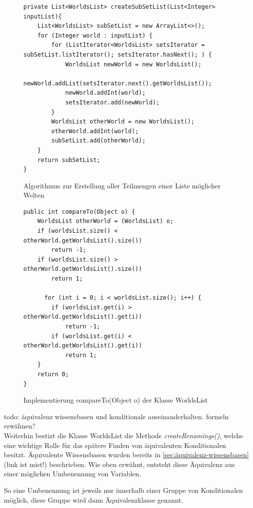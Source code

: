 \documentclass[12pt,a4paper]{article}
\begin{document}
\begin{figure}
\begin{lstlisting}
private List<WorldsList> createSubSetList(List<Integer> inputList){
    List<WorldsList> subSetList = new ArrayList<>();
    for (Integer world : inputList) {
        for (ListIterator<WorldsList> setsIterator = subSetList.listIterator(); setsIterator.hasNext(); ) {
            WorldsList newWorld = new WorldsList();
            newWorld.addList(setsIterator.next().getWorldsList());
            newWorld.addInt(world);
            setsIterator.add(newWorld);
        }
        WorldsList otherWorld = new WorldsList();
        otherWorld.addInt(world);
        subSetList.add(otherWorld);
    }
    return subSetList;
}
\end{lstlisting}
\caption{Algorithmus zur Erstellung aller Teilmengen einer Liste möglicher Welten}
\label{code:subsets}
\end{figure}



\begin{figure}
\begin{lstlisting}
public int compareTo(Object o) {
    WorldsList otherWorld = (WorldsList) o;
    if (worldsList.size() < otherWorld.getWorldsList().size())
        return -1;
    if (worldsList.size() > otherWorld.getWorldsList().size())
        return 1;
          
      for (int i = 0; i < worldsList.size(); i++) {
        if (worldsList.get(i) > otherWorld.getWorldsList().get(i))
            return -1;
        if (worldsList.get(i) < otherWorld.getWorldsList().get(i))
            return 1;
    }
    return 0;
}
\end{lstlisting}
\caption{Implementierung compareTo(Object o) der Klasse WorldsList}
\label{code:compare-worldslist}
\end{figure}

todo: äquivalenz wissensbasen und konditionale auseinanderhalten. formeln erwähnen? \\
Weiterhin bestizt die Klasse WorldsList die Methode \textit{createRenamings()}, welche eine wichtige Rolle für das spätere Finden von äquivalenten Konditionalen besitzt. Äquivalente Wissensbasen wurden bereits in  \autoref{sec:äquivalenz-wissensbasen} (link ist mist!) beschrieben. Wie oben erwähnt, entsteht diese Äquivalenz aus einer möglichen Umbenennung von Variablen. 

So eine Umbenennung ist jeweils nur innerhalb einer Gruppe von Konditionalen möglich, diese Gruppe wird dann Äquivalenzklasse genannt. 
\end{document}
